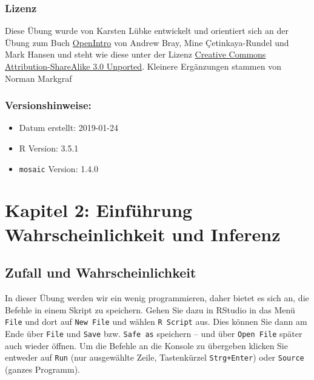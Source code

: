 \documentclass[12pt,ngerman,paper=a4,pagesize,DIV=13]{scrreprt}
\providecommand{\tightlist}{%
  \setlength{\itemsep}{0pt}\setlength{\parskip}{0pt}}
\begin{document}
\hypertarget{lizenz-1}{%
\subsection{Lizenz}\label{lizenz-1}}

Diese Übung wurde von Karsten Lübke entwickelt und orientiert sich an
der Übung zum Buch
\href{https://www.openintro.org/stat/index.php?stat_book=isrs}{OpenIntro}
von Andrew Bray, Mine Çetinkaya-Rundel und Mark Hansen und steht wie
diese unter der Lizenz
\href{http://creativecommons.org/licenses/by-sa/3.0}{Creative Commons
Attribution-ShareAlike 3.0 Unported}. Kleinere Ergänzungen stammen von
Norman Markgraf

\hypertarget{versionshinweise-1}{%
\subsection{Versionshinweise:}\label{versionshinweise-1}}

\begin{itemize}
\tightlist
\item
  Datum erstellt: 2019-01-24
\item
  R Version: 3.5.1
\item
  \texttt{mosaic} Version: 1.4.0
\end{itemize}

\hypertarget{kapitel-2-einfuhrung-wahrscheinlichkeit-und-inferenz}{%
\chapter{Kapitel 2: Einführung Wahrscheinlichkeit und
Inferenz}\label{kapitel-2-einfuhrung-wahrscheinlichkeit-und-inferenz}}

\hypertarget{zufall-und-wahrscheinlichkeit}{%
\section{Zufall und
Wahrscheinlichkeit}\label{zufall-und-wahrscheinlichkeit}}

In dieser Übung werden wir ein wenig programmieren, daher bietet es sich
an, die Befehle in einem Skript zu speichern. Gehen Sie dazu in RStudio
in das Menü \texttt{File} und dort auf \texttt{New\ File} und wählen
\texttt{R\ Script} aus. Dies können Sie dann am Ende über \texttt{File}
und \texttt{Save} bzw. \texttt{Safe\ as} speichern -- und über
\texttt{Open\ File} später auch wieder öffnen. Um die Befehle an die
Konsole zu übergeben klicken Sie entweder auf \texttt{Run} (nur
ausgewählte Zeile, Tastenkürzel \texttt{Strg+Enter}) oder
\texttt{Source} (ganzes Programm).
\end{document}
